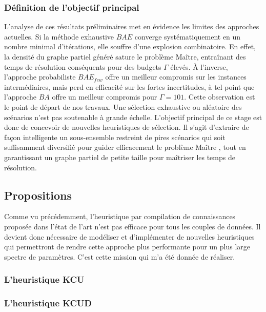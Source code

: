 \documentclass[12pt, a4paper, twoside]{article}
\numberwithin{equation}{section}
\begin{document}
	\subsubsection{Définition de l'objectif principal}
	
	L'analyse de ces résultats préliminaires met en évidence les limites des approches actuelles. Si la méthode exhaustive $BAE$ converge systématiquement en un nombre minimal d'itérations, elle souffre d'une explosion combinatoire. En effet, la densité du graphe partiel généré sature le problème Maître, entraînant des temps de résolution conséquents pour des budgets $\Gamma$ élevés. À l'inverse, l'approche probabiliste $BAE_{few}$ offre un meilleur compromis sur les instances intermédiaires, mais perd en efficacité sur les fortes incertitudes, à tel point que l'approche $BA$ offre un meilleur compromis pour $\Gamma=101$. Cette observation est le point de départ de nos travaux. Une sélection exhaustive ou aléatoire des scénarios n'est pas soutenable à grande échelle. L'objectif principal de ce stage est donc de concevoir de nouvelles heuristiques de sélection. Il s'agit d'extraire de façon intelligente un sous-ensemble restreint de pires scénarios qui soit suffisamment diversifié pour guider efficacement le problème Maître , tout en garantissant un graphe partiel de petite taille pour maîtriser les temps de résolution.
	
	\subsection{Propositions}

    Comme vu précédemment, l'heuristique par compilation de connaissances proposée dans l'état de l'art n'est pas efficace pour tous les couples de données. Il devient donc nécessaire de modéliser et d'implémenter de nouvelles heuristiques qui permettront de rendre cette approche plus performante pour un plus large spectre de paramètres. C'est cette mission qui m'a été donnée de réaliser.

    
    \subsubsection{L'heuristique KCU}



    \subsubsection{L'heuristique KCUD}
\end{document}
